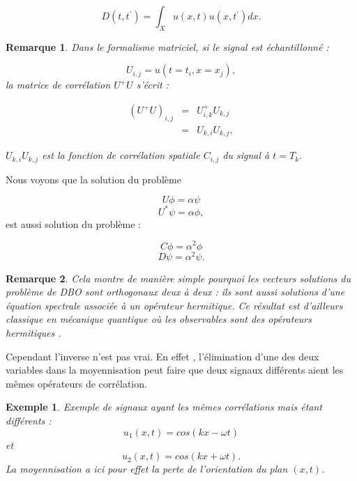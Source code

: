 \documentclass{book}
\newtheorem{exmp}{Exemple}[chapter]
\newtheorem{rem}{Remarque}[chapter]
\begin{document}
\begin{equation}
D(t,t^\prime)=\int_X u(x,t)u(x,t^\prime)dx.
\end{equation}

\begin{rem}
Dans le formalisme matriciel, si le signal est \'echantillonn\'e :

\begin{equation}
U_{i,j}=u(t=t_i,x=x_j),
\end{equation}
la matrice de corr\'elation $U^+U$ s'\'ecrit :

\begin{eqnarray}
(U^+U)_{i,j}&=&U^+_{i,k}U_{k,j}\\
&=&U_{k,i}U_{k,j},
\end{eqnarray}

$U_{k,i}U_{k,j}$ est la fonction de corr\'elation 
spatiale $C_{i,j}$ du signal \`a $t=T_k$. 
\end{rem}
Nous voyons que la solution du probl\`eme

\begin{equation}
U\phi=\alpha\psi
\end{equation}
\begin{equation}
U^*\psi=\alpha\phi,
\end{equation}
est aussi solution du probl\`eme :

\begin{equation}
C\phi=\alpha^2\phi
\end{equation}
\begin{equation}
D\psi=\alpha^2\psi.
\end{equation}




\begin{rem}
Cela montre de mani\`ere simple pourquoi les vecteurs solutions
du probl\`eme de DBO sont orthogonaux deux \`a deux : ils sont aussi
solutions d'une \'equation spectrale associ\'ee \`a un op\'erateur
hermitique. 
Ce r\'esultat est d'ailleurs classique en m\'ecanique quantique
o\`u les observables sont des op\'erateurs hermitiques \cite{Cohen73}.
\end{rem}

Cependant l'inverse n'est pas vrai.
En effet \cite{Aubry95a}, l'\'elimination d'une des deux variables
dans la moyennisation peut faire que deux signaux diff\'erents aient les
m\^emes op\'erateurs de corr\'elation.


\begin{exmp}
Exemple de signaux ayant  les m\^emes corr\'elations
mais \'etant diff\'erents :
\begin{equation}
u_1(x,t)=cos(kx-\omega t)
\end{equation}
et
\begin{equation}
u_2(x,t)=cos(kx+\omega t).
\end{equation}
La moyennisation a ici pour effet la perte de l'orientation
du plan $(x,t)$.
\end{exmp}
\end{document}
